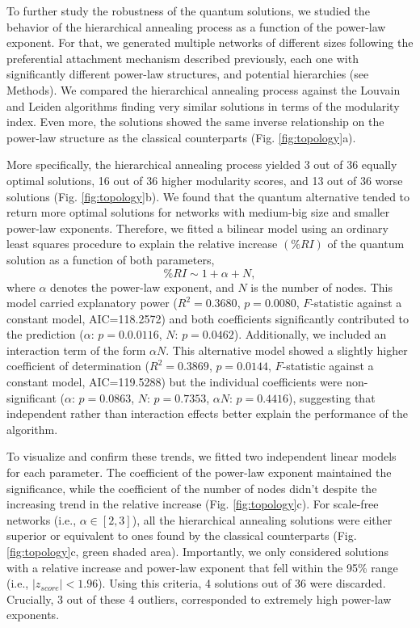 \documentclass[pdflatex,sn-mathphys-num]{sn-jnl}%
\begin{document}
To further study the robustness of the quantum solutions, we studied the behavior of the hierarchical annealing process as a function of the power-law exponent. For that, we generated multiple networks of different sizes following the preferential attachment mechanism described previously, each one with significantly different power-law structures, and potential hierarchies (see Methods). We compared the hierarchical annealing process against the Louvain and Leiden algorithms finding very similar solutions in terms of the modularity index. Even more, the solutions showed the same inverse relationship on the power-law structure as the classical counterparts (Fig. \ref{fig:topology}a). 

More specifically, the hierarchical annealing process yielded 3 out of 36 equally optimal solutions, 16 out of 36 higher modularity scores, and 13 out of 36 worse solutions (Fig. \ref{fig:topology}b). We found that the quantum alternative tended to return more optimal solutions for networks with medium-big size and smaller power-law exponents. Therefore, we fitted a bilinear model using an ordinary least squares procedure to explain the relative increase $(\%RI)$ of the quantum solution as a function of both parameters, $$ \%RI \sim 1 + \alpha + N,$$ where $\alpha$ denotes the power-law exponent, and $N$ is the number of nodes. This model carried explanatory power ($R^2=0.3680$, $p=0.0080$, $F$-statistic against a constant model, AIC=118.2572) and both coefficients significantly contributed to the prediction ($\alpha$: $ p=0.0.0116$, $N$: $ p=0.0462$). Additionally, we included an interaction term of the form $\alpha N$. This alternative model showed a slightly higher coefficient of determination ($R^2=0.3869$, $p=0.0144$, $F$-statistic against a constant model, AIC=119.5288) but the individual coefficients were non-significant ($\alpha$: $ p=0.0863$, $N$: $ p=0.7353$, $\alpha N$: $p=0.4416$), suggesting that independent rather than interaction effects better explain the performance of the algorithm. 

To visualize and confirm these trends, we fitted two independent linear models for each parameter. The coefficient of the power-law exponent maintained the significance, while the coefficient of the number of nodes didn't despite the increasing trend in the relative increase (Fig. \ref{fig:topology}c). For scale-free networks (i.e., $\alpha \in [2,3]$), all the hierarchical annealing solutions were either superior or equivalent to ones found by the classical counterparts (Fig. \ref{fig:topology}c, green shaded area). Importantly, we only considered solutions with a relative increase and power-law exponent that fell within the 95\% range (i.e., $|z_{score}|<1.96$). Using this criteria, 4 solutions out of 36 were discarded. Crucially, 3 out of these 4 outliers, corresponded to extremely high power-law exponents.
\end{document}

